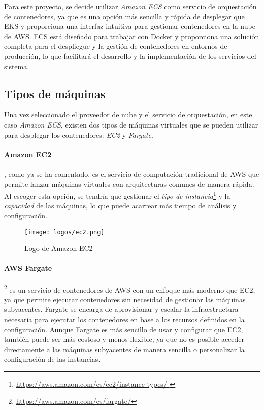 Para este proyecto, se decide utilizar \textit{Amazon ECS} como servicio de
orquestación de contenedores, ya que es una opción más sencilla y rápida de
desplegar que EKS y proporciona una interfaz intuitiva para gestionar
contenedores en la nube de AWS. ECS está diseñado para trabajar con Docker y
proporciona una solución completa para el despliegue y la gestión de
contenedores en entornos de producción, lo que facilitará el desarrollo y la
implementación de los servicios del sistema.


\newpage{}
\subsection{Tipos de máquinas}\label{subsec:alt_maquinas}
Una vez seleccionado el proveedor de nube y el servicio de orquestación, en
este caso \textit{Amazon ECS}, existen dos tipos de máquinas virtuales que se
pueden utilizar para desplegar los contenedores: \textit{EC2} y \textit{Fargate}.

\paragraph{Amazon EC2}, como ya se ha comentado, es el servicio de computación
tradicional de AWS que permite lanzar máquinas virtuales con arquitecturas
comunes de manera rápida. Al escoger esta opción, se tendría que gestionar el
\textit{tipo de instancia}\footnote{\url{
	https://aws.amazon.com/es/ec2/instance-types/
}} y la \textit{capacidad} de las máquinas, lo que puede acarrear más tiempo de
análisis y configuración.

\begin{figure}[H]
	\centering
	\texttt{[image: logos/ec2.png]}
	\caption{Logo de Amazon EC2~\textregistered}
	\label{fig:ec2}
\end{figure}

\paragraph{AWS Fargate}\footnote{\url{https://aws.amazon.com/es/fargate/}} es un
servicio de contenedores de AWS con un enfoque más moderno que EC2, ya que
permite ejecutar contenedores sin necesidad de gestionar las máquinas
subyacentes. Fargate se encarga de aprovisionar y escalar la infraestructura
necesaria para ejecutar los contenedores en base a los recursos definidos en la
configuración. Aunque Fargate es más sencillo de usar y configurar que EC2,
también puede ser más costoso y menos flexible, ya que no es posible acceder
directamente a las máquinas subyacentes de manera sencilla o personalizar la
configuración de las instancias.

